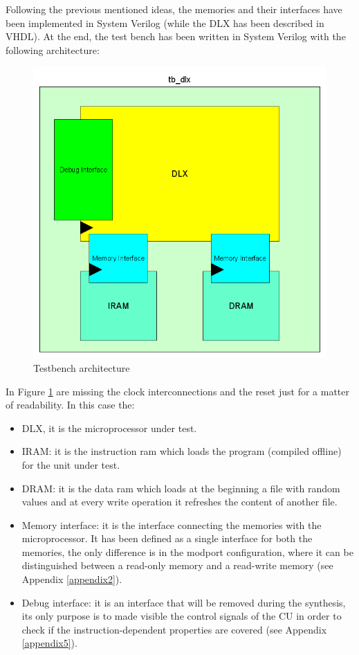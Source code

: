 Following the previous mentioned ideas, the memories and their interfaces have been implemented in System Verilog (while the DLX has been described in VHDL). At the end, the test bench has been written in System Verilog with the following architecture:
\begin{figure}[!htbp]
\centering
\captionsetup{justification=centering}
\includegraphics[scale=0.35,angle=0]{./chapters/figures/tb_dlx.png}
\caption{Testbench architecture}
\label{fig:tbdlx}
\end{figure}

In Figure \ref{fig:tbdlx} are missing the clock interconnections and the reset just for a matter of readability. In this case the:
\begin{itemize}
\item DLX, it is the microprocessor under test.
\item IRAM: it is the instruction ram which loads the program (compiled offline) for the unit under test.
\item DRAM: it is the data ram which loads at the beginning a file with random values and at every write operation it refreshes the content of another file.
\item Memory interface: it is the interface connecting the memories with the microprocessor. It has been defined as a single interface for both the memories, the only difference is in the modport configuration, where it can be distinguished between a read-only memory and a read-write memory (see Appendix \ref{appendix2}).
\item Debug interface: it is an interface that will be removed during the synthesis, its only purpose is to made visible the control signals of the CU in order to check if the instruction-dependent properties are covered (see Appendix \ref{appendix5}).
\end{itemize}

